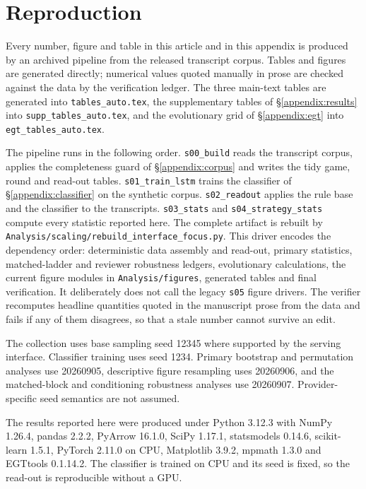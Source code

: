 \documentclass[openacc]{rsproca_new}
\begin{document}


\section{Reproduction}\label{appendix:repro}

Every number, figure and table in this article and in this appendix is produced
by an archived pipeline from the released transcript corpus. Tables and figures
are generated directly; numerical values quoted manually in prose are checked
against the data by the verification ledger. The three main-text tables are
generated into \texttt{tables\_auto.tex}, the supplementary tables of
\S\ref{appendix:results} into \texttt{supp\_tables\_auto.tex}, and the
evolutionary grid of \S\ref{appendix:egt} into \texttt{egt\_tables\_auto.tex}.

The pipeline runs in the following order. \texttt{s00\_build} reads the
transcript corpus, applies the completeness guard of
\S\ref{appendix:corpus} and writes the tidy game, round and read-out tables.
\texttt{s01\_train\_lstm} trains the classifier of \S\ref{appendix:classifier}
on the synthetic corpus. \texttt{s02\_readout} applies the rule base and the
classifier to the transcripts. \texttt{s03\_stats} and
\texttt{s04\_strategy\_stats} compute every statistic reported here.
The complete artifact is rebuilt by
\texttt{Analysis/scaling/rebuild\_interface\_focus.py}. This driver encodes the
dependency order: deterministic data assembly and read-out, primary statistics,
matched-ladder and reviewer robustness ledgers, evolutionary calculations, the
current figure modules in \texttt{Analysis/figures}, generated tables and final
verification. It deliberately does not call the legacy \texttt{s05} figure
drivers. The verifier recomputes headline quantities quoted in the manuscript
prose from the data and fails if any of them disagrees, so that a stale number
cannot survive an edit.

The collection uses base sampling seed 12345 where supported by the serving
interface. Classifier training uses seed 1234. Primary bootstrap and permutation
analyses use 20260905, descriptive figure resampling uses 20260906, and the
matched-block and conditioning robustness analyses use 20260907. Provider-specific
seed semantics are not assumed.

The results reported here were produced under Python 3.12.3 with NumPy 1.26.4,
pandas 2.2.2, PyArrow 16.1.0, SciPy 1.17.1, statsmodels 0.14.6,
scikit-learn 1.5.1, PyTorch 2.11.0 on CPU, Matplotlib 3.9.2, mpmath 1.3.0 and
EGTtools 0.1.14.2. The classifier is trained on CPU and its seed is fixed, so
the read-out is reproducible without a GPU.


\printbibliography
\end{document}
